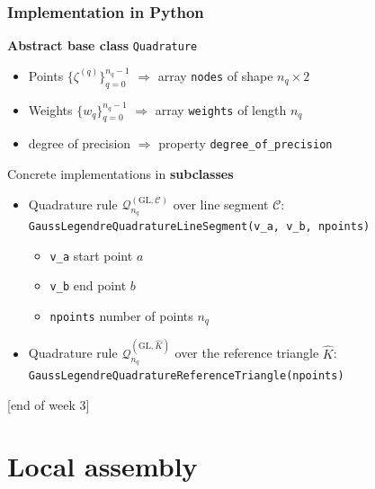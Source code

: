 \documentclass{beamer}
\begin{document}
\begin{frame}[fragile]
\frametitle{Implementation in Python}
\textbf{Abstract base class} \lstinline{Quadrature}
\begin{itemize}
\item Points $\{\zeta^{(q)}\}_{q=0}^{n_q-1}$ $\Rightarrow$ array \lstinline{nodes} of shape $n_q\times 2$
\item Weights $\{w_q\}_{q=0}^{n_q-1}$ $\Rightarrow$ array \lstinline{weights} of length $n_q$
\item degree of precision $\Rightarrow$ property \lstinline{degree_of_precision}
\end{itemize}
\vspace{2ex}
Concrete implementations in \textbf{subclasses}
\begin{itemize}
  \item Quadrature rule $\mathcal{Q}^{(\text{GL},\mathcal{C})}_{n_q}$ over line segment $\mathcal{C}$: \lstinline{GaussLegendreQuadratureLineSegment(v_a, v_b, npoints)}
  \begin{itemize}
    \item \lstinline{v_a} start point $a$
    \item \lstinline{v_b} end point $b$
    \item \lstinline{npoints} number of points $n_q$
  \end{itemize}
  \item Quadrature rule $\mathcal{Q}^{(\text{GL},\widehat{K})}_{n_q}$ over the reference triangle $\widehat{K}$: \lstinline{GaussLegendreQuadratureReferenceTriangle(npoints)}
\end{itemize}
{\begin{flushright} {\footnotesize [end of week 3]} \end{flushright}}
\end{frame}


\section{Local assembly}


\begin{frame}
  \tableofcontents[currentsection]
\end{frame}

\end{document}
